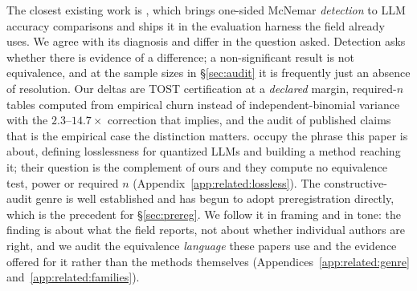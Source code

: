 The closest existing work is \citet{llmaccuracystats2026}, which brings
one-sided McNemar \emph{detection} to LLM accuracy comparisons and ships it in
the evaluation harness the field already uses. We agree with its diagnosis and
differ in the question asked. Detection asks whether there is evidence of a
difference; a non-significant result is not equivalence, and at the sample sizes
in \S\ref{sec:audit} it is frequently just an absence of resolution. Our deltas
are TOST certification at a \emph{declared} margin, required-$n$ tables computed
from empirical churn instead of independent-binomial variance with the
$2.3$--$14.7\times$ correction that implies, and the audit of published claims
that is the empirical case the distinction matters. \citet{helcig2026slq} occupy
the phrase this paper is about, defining losslessness for quantized LLMs and
building a method reaching it; their question is the complement of ours and they
compute no equivalence test, power or required $n$
(Appendix~\ref{app:related:lossless}). The constructive-audit genre is well
established \citep{dodge2019showyourwork,marie2021mtaudit} and has begun to
adopt preregistration directly, which is the precedent for \S\ref{sec:prereg}.
We follow it in framing and in tone: the finding is about what the field
reports, not about whether individual authors are right, and we audit the
equivalence \emph{language} these papers use and the evidence offered for it
rather than the methods themselves (Appendices~\ref{app:related:genre}
and~\ref{app:related:families}).
